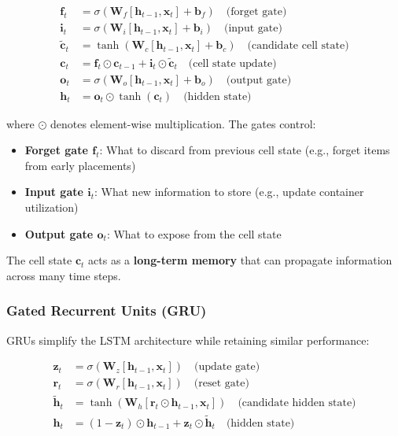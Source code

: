 \begin{align}
\mathbf{f}_t &= \sigma(\mathbf{W}_f [\mathbf{h}_{t-1}, \mathbf{x}_t] + \mathbf{b}_f) \quad \text{(forget gate)} \\
\mathbf{i}_t &= \sigma(\mathbf{W}_i [\mathbf{h}_{t-1}, \mathbf{x}_t] + \mathbf{b}_i) \quad \text{(input gate)} \\
\tilde{\mathbf{c}}_t &= \tanh(\mathbf{W}_c [\mathbf{h}_{t-1}, \mathbf{x}_t] + \mathbf{b}_c) \quad \text{(candidate cell state)} \\
\mathbf{c}_t &= \mathbf{f}_t \odot \mathbf{c}_{t-1} + \mathbf{i}_t \odot \tilde{\mathbf{c}}_t \quad \text{(cell state update)} \\
\mathbf{o}_t &= \sigma(\mathbf{W}_o [\mathbf{h}_{t-1}, \mathbf{x}_t] + \mathbf{b}_o) \quad \text{(output gate)} \\
\mathbf{h}_t &= \mathbf{o}_t \odot \tanh(\mathbf{c}_t) \quad \text{(hidden state)}
\end{align}

where $\odot$ denotes element-wise multiplication. The gates control:
\begin{itemize}
\item \textbf{Forget gate $\mathbf{f}_t$}: What to discard from previous cell state (e.g., forget items from early placements)
\item \textbf{Input gate $\mathbf{i}_t$}: What new information to store (e.g., update container utilization)
\item \textbf{Output gate $\mathbf{o}_t$}: What to expose from the cell state
\end{itemize}

The cell state $\mathbf{c}_t$ acts as a \textbf{long-term memory} that can propagate information across many time steps.

\subsubsection{Gated Recurrent Units (GRU)}

GRUs simplify the LSTM architecture while retaining similar performance:

\begin{align}
\mathbf{z}_t &= \sigma(\mathbf{W}_z [\mathbf{h}_{t-1}, \mathbf{x}_t]) \quad \text{(update gate)} \\
\mathbf{r}_t &= \sigma(\mathbf{W}_r [\mathbf{h}_{t-1}, \mathbf{x}_t]) \quad \text{(reset gate)} \\
\tilde{\mathbf{h}}_t &= \tanh(\mathbf{W}_h [\mathbf{r}_t \odot \mathbf{h}_{t-1}, \mathbf{x}_t]) \quad \text{(candidate hidden state)} \\
\mathbf{h}_t &= (1 - \mathbf{z}_t) \odot \mathbf{h}_{t-1} + \mathbf{z}_t \odot \tilde{\mathbf{h}}_t \quad \text{(hidden state)}
\end{align}

